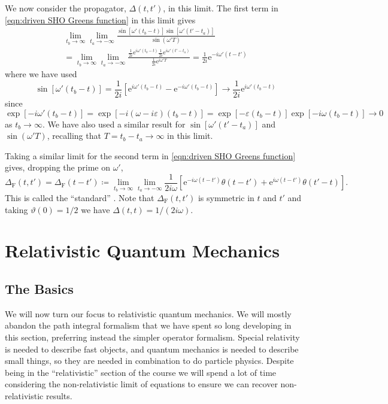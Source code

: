 \documentclass[fleqn]{NotesClass}
\newcommand*{\e}{\mathrm{e}}
\begin{document}
    We now consider the propagator, \(\Delta(t, t')\), in this limit.
    The first term in \cref{eqn:driven SHO Greens function} in this limit gives
    \begin{multline}
        \lim_{t_b \to \infty} \lim_{t_a \to -\infty} \frac{\sin[\omega'(t_b - t)]\sin[\omega'(t' - t_a)]}{\sin(\omega' T)}\\
        = \lim_{t_b \to \infty} \lim_{t_a \to -\infty} \frac{\frac{1}{2i}\e^{i\omega'(t_b - t)} \frac{1}{2i}\e^{i\omega'(t' - t_a)}}{\frac{1}{2i}\e^{i\omega'T}} = \frac{1}{2i} \e^{-i\omega'(t - t')}
    \end{multline}
    where we have used
    \begin{equation}
        \sin[\omega'(t_b - t)] = \frac{1}{2i}[\e^{i\omega'(t_b - t)} - \e^{-i\omega'(t_b - t)}] \to \frac{1}{2i}\e^{i\omega'(t_b - t)}
    \end{equation}
    since 
    \begin{equation}
        \exp[-i\omega'(t_b - t)] = \exp[-i(\omega - i\varepsilon)(t_b - t)] = \exp[-\varepsilon(t_b - t)]\exp[-i\omega(t_b - t)] \to 0
    \end{equation}
    as \(t_b \to \infty\).
    We have also used a similar result for \(\sin[\omega'(t' - t_a)]\) and \(\sin(\omega' T)\), recalling that \(T = t_b - t_a \to \infty\) in this limit.
    
    Taking a similar limit for the second term in \cref{eqn:driven SHO Greens function} gives, dropping the prime on \(\omega'\),
    \begin{equation}
        \Delta_{\mathrm{F}}(t, t') = \Delta_{\mathrm{F}}(t - t') \coloneqq \lim_{t_b\to\infty} \lim_{t_a \to -\infty} \frac{1}{2i\omega} [\e^{-i\omega(t - t')}\theta(t - t') + \e^{i\omega(t - t')}\theta(t' - t)].
    \end{equation}
    This is called the \enquote{standard} .
    Note that \(\Delta_{\mathrm{F}}(t, t')\) is symmetric in \(t\) and \(t'\) and taking \(\vartheta(0) = 1/2\) we have \(\Delta(t, t) = 1/(2i\omega)\).
    
    \part{Relativistic Quantum Mechanics}
    \chapter{The Basics}
    We will now turn our focus to relativistic quantum mechanics.
    We will mostly abandon the path integral formalism that we have spent so long developing in this section, preferring instead the simpler operator formalism.
    Special relativity is needed to describe fast objects, and quantum mechanics is needed to describe small things, so they are needed in combination to do particle physics.
    Despite being in the \enquote{relativistic} section of the course we will spend a lot of time considering the non-relativistic limit of equations to ensure we can recover non-relativistic results.
    
\end{document}
